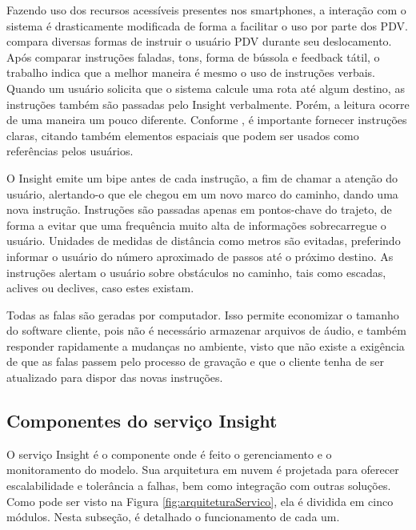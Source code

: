 \documentclass[twoside,english,brazilian]{UNISINOSartigo}
\begin{document}
Fazendo uso dos recursos acessíveis presentes nos smartphones, a interação com o sistema é drasticamente modificada de forma a facilitar o uso por parte dos PDV.  compara diversas formas de instruir o usuário PDV durante seu deslocamento. Após comparar instruções faladas, tons, forma de bússola e feedback tátil, o trabalho indica que a melhor maneira é mesmo o uso de instruções verbais. Quando um usuário solicita que o sistema calcule uma rota até algum destino, as instruções também são passadas pelo Insight verbalmente. Porém, a leitura ocorre de uma maneira um pouco diferente. Conforme , é importante fornecer instruções claras, citando também elementos espaciais que podem ser usados como referências pelos usuários.

O Insight emite um bipe antes de cada instrução, a fim de chamar a atenção do usuário, alertando-o que ele chegou em um novo marco do caminho, dando uma nova instrução. Instruções são passadas apenas em pontos-chave do trajeto, de forma a evitar que uma frequência muito alta de informações sobrecarregue o usuário. Unidades de medidas de distância como metros são evitadas, preferindo informar o usuário do número aproximado de passos até o próximo destino. As instruções alertam o usuário sobre obstáculos no caminho, tais como escadas, aclives ou declives, caso estes existam.

Todas as falas são geradas por computador. Isso permite economizar o tamanho do software cliente, pois não é necessário armazenar arquivos de áudio, e também responder rapidamente a mudanças no ambiente, visto que não existe a exigência de que as falas passem pelo processo de gravação e que o cliente tenha de ser atualizado para dispor das novas instruções.

\subsection{Componentes do serviço Insight}
O serviço Insight é o componente onde é feito o gerenciamento e o monitoramento do modelo. Sua arquitetura em nuvem é projetada para oferecer escalabilidade e tolerância a falhas, bem como integração com outras soluções. Como pode ser visto na Figura \ref{fig:arquiteturaServico}, ela é dividida em cinco módulos. Nesta subseção, é detalhado o funcionamento de cada um.
\end{document}
